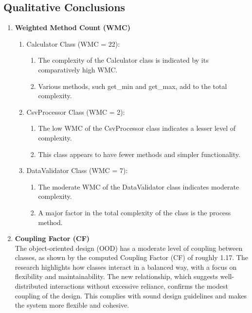 \subsection{Qualitative Conclusions}
\begin{enumerate}

\item \textbf{Weighted Method Count (WMC)}\\
\begin{enumerate}
    \item Calculator Class (WMC = 22):
    \begin{enumerate}
        \item The complexity of the Calculator class is indicated by its comparatively high WMC. 
        \item Various methods, such get\_min and get\_max, add to the total complexity.
    \end{enumerate}
    \item CsvProcessor  Class (WMC = 2):
    \begin{enumerate}
        \item The low WMC of the CsvProcessor class indicates a lesser level of complexity. 
        \item This class appears to have fewer methods and simpler functionality.
    \end{enumerate}
    
    \item DataValidator Class (WMC = 7):
    \begin{enumerate}
        \item The moderate WMC of the DataValidator class indicates moderate complexity. 
        \item A major factor in the total complexity of the class is the process method.
    \end{enumerate}
\end{enumerate}

\item \textbf{Coupling Factor (CF)}\\
The object-oriented design (OOD) has a moderate level of coupling between classes, as shown by the computed Coupling Factor (CF) of roughly 1.17. The research highlights how classes interact in a balanced way, with a focus on flexibility and maintainability. The new relationship, which suggests well-distributed interactions without excessive reliance, confirms the modest coupling of the design. This complies with sound design guidelines and makes the system more flexible and cohesive.


\end{enumerate}
